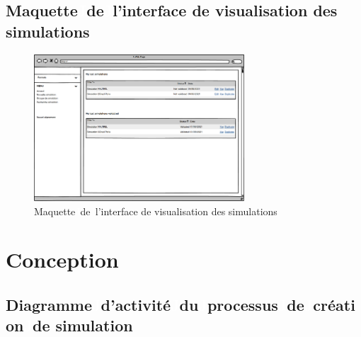 \subsection{Maquette\textcolor{white}{J}de\textcolor{white}{J}l’interface de visualisation des simulations}
\begin{figure}[!ht]\centering
\includegraphics[width=0.7\textwidth,angle=00]{chapitres/chapitre5/figures/Maq-3.png}
\caption{Maquette\textcolor{white}{J}de\textcolor{white}{J}l’interface de visualisation des simulations}
\label{fig:OffreSeq}
\end{figure}

\newpage
\section{Conception}
\subsection{Diagramme\textcolor{white}{J}d'activité\textcolor{white}{J}du\textcolor{white}{J}processus\textcolor{white}{J}de\textcolor{white}{J}création\textcolor{white}{J}de simulation}
 
